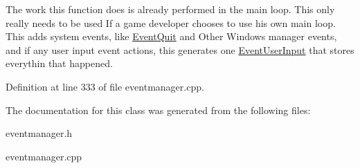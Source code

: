 The work this function does is already performed in the main loop. This only really needs to be used If a game developer chooses to use his own main loop. This adds system events, like \hyperlink{classMezzanine_1_1EventQuit}{EventQuit} and Other Windows manager events, and if any user input event actions, this generates one \hyperlink{classMezzanine_1_1EventUserInput}{EventUserInput} that stores everythin that happened. 

Definition at line 333 of file eventmanager.cpp.



The documentation for this class was generated from the following files:\begin{DoxyCompactItemize}
\item 
eventmanager.h\item 
eventmanager.cpp\end{DoxyCompactItemize}
